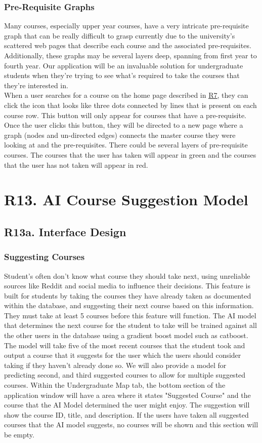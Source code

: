 \documentclass[12pt, a4paper]{article}
\begin{document}
\subsubsection*{Pre-Requisite Graphs}
Many courses, especially upper year courses, have a very intricate pre-requisite graph that can be really difficult to grasp currently due to the university's scattered web pages that describe each course and the associated pre-requisites. Additionally, these graphs may be several layers deep, spanning from first year to fourth year. Our application will be an invaluable solution for undergraduate students when they're trying to see what's required to take the courses that they're interested in.\\

When a user searches for a course on the home page described in \underline{\hyperref[sec:R7]{R7}}, they can click the icon that looks like three dots connected by lines that is present on each course row. This button will only appear for courses that have a pre-requisite. Once the user clicks this button, they will be directed to a new page where a graph (nodes and un-directed edges) connects the master course they were looking at and the pre-requisites. There could be several layers of pre-requisite courses. The courses that the user has taken will appear in green and the courses that the user has not taken will appear in red.
\section*{R13. AI Course Suggestion Model}
\label{sec:R13}
\subsection*{R13a. Interface Design}
\subsubsection*{Suggesting Courses}
Student's often don't know what course they should take next, using unreliable sources like Reddit and social media to influence their decisions. This feature is built for students by taking the courses they have already taken as documented within the database, and suggesting their next course based on this information. They must take at least 5 courses before this feature will function. The AI model that determines the next course for the student to take will be trained against all the other users in the database using a gradient boost model such as catboost. The model will take five of the most recent courses that the student took and output a course that it suggests for the user which the users should consider taking if they haven't already done so. We will also provide a model for predicting second, and third suggested courses to allow for multiple suggested courses. Within the Undergraduate Map tab, the bottom section of the application window will have a area where it states "Suggested Course" and the course that the AI Model determined the user might enjoy. The suggestion will show the course ID, title, and description. If the users have taken all suggested courses that the AI model suggests, no courses will be shown and this section will be empty.
\end{document}

